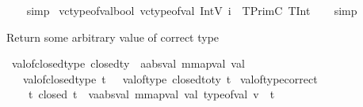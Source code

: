 \begin{isabellebody}
\ \ %
\endisadelimproof
%
\isatagproof
{}\isamarkupfalse%
\ simp%
\endisatagproof
{\isafoldproof}%
%
\isadelimproof
\isanewline
%
\endisadelimproof
\isanewline
{}\isamarkupfalse%
\ vc{\isacharunderscore}{\kern0pt}type{\isacharunderscore}{\kern0pt}of{\isacharunderscore}{\kern0pt}val{\isacharunderscore}{\kern0pt}bool{\isacharcolon}{\kern0pt}\ {\isachardoublequoteopen}vc{\isacharunderscore}{\kern0pt}type{\isacharunderscore}{\kern0pt}of{\isacharunderscore}{\kern0pt}val\ {\isacharparenleft}{\kern0pt}IntV\ i{\isacharparenright}{\kern0pt}\ {\isacharequal}{\kern0pt}\ TPrimC\ TInt{\isachardoublequoteclose}\isanewline
%
\isadelimproof
\ \ %
\endisadelimproof
%
\isatagproof
{}\isamarkupfalse%
\ simp%
\endisatagproof
{\isafoldproof}%
%
\isadelimproof
%
\endisadelimproof
%
\begin{isamarkuptext}%
Return some arbitrary value of correct type%
\end{isamarkuptext}\isamarkuptrue%
\isamarkupfalse%
\ val{\isacharunderscore}{\kern0pt}of{\isacharunderscore}{\kern0pt}closed{\isacharunderscore}{\kern0pt}type\ {\isacharcolon}{\kern0pt}{\isacharcolon}{\kern0pt}{\isachardoublequoteopen}closed{\isacharunderscore}{\kern0pt}ty\ {\isasymRightarrow}\ {\isacharparenleft}{\kern0pt}{\isacharprime}{\kern0pt}a{\isacharcolon}{\kern0pt}{\isacharcolon}{\kern0pt}absval{\isacharcomma}{\kern0pt}\ {\isacharprime}{\kern0pt}m{\isacharcolon}{\kern0pt}{\isacharcolon}{\kern0pt}mapval{\isacharparenright}{\kern0pt}\ val{\isachardoublequoteclose}\isanewline
\ \ \isanewline
\ \ \ {\isachardoublequoteopen}val{\isacharunderscore}{\kern0pt}of{\isacharunderscore}{\kern0pt}closed{\isacharunderscore}{\kern0pt}type\ t\ \ {\isacharequal}{\kern0pt}\ {\isacharparenleft}{\kern0pt}val{\isacharunderscore}{\kern0pt}of{\isacharunderscore}{\kern0pt}type\ {\isacharparenleft}{\kern0pt}closed{\isacharunderscore}{\kern0pt}to{\isacharunderscore}{\kern0pt}ty\ t{\isacharparenright}{\kern0pt}{\isacharparenright}{\kern0pt}{\isachardoublequoteclose}\isanewline
\isanewline
{}\isamarkupfalse%
\ val{\isacharunderscore}{\kern0pt}of{\isacharunderscore}{\kern0pt}type{\isacharunderscore}{\kern0pt}correct{\isacharcolon}{\kern0pt}\isanewline
\ \ \ {\isachardoublequoteopen}{\isasymAnd}\ t{\isachardot}{\kern0pt}\ closed\ t\ {\isasymLongrightarrow}\ {\isasymexists}v{\isacharcolon}{\kern0pt}{\isacharcolon}{\kern0pt}{\isacharparenleft}{\kern0pt}{\isacharprime}{\kern0pt}a{\isacharcolon}{\kern0pt}{\isacharcolon}{\kern0pt}absval{\isacharcomma}{\kern0pt}\ {\isacharprime}{\kern0pt}m{\isacharcolon}{\kern0pt}{\isacharcolon}{\kern0pt}mapval{\isacharparenright}{\kern0pt}\ val{\isachardot}{\kern0pt}\ type{\isacharunderscore}{\kern0pt}of{\isacharunderscore}{\kern0pt}val\ v\ {\isacharequal}{\kern0pt}\ t{\isachardoublequoteclose}\ \isanewline

\end{isabellebody}
